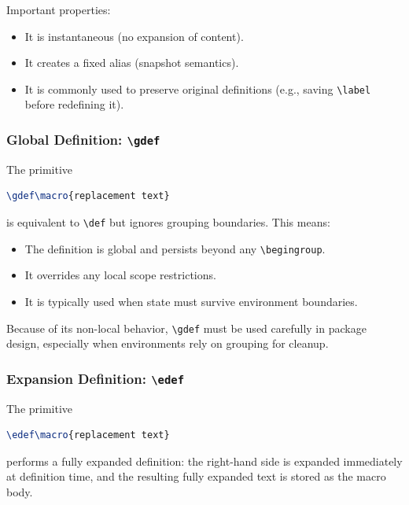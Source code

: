 Important properties:

\begin{itemize}
\item It is instantaneous (no expansion of content).
\item It creates a fixed alias (snapshot semantics).
\item It is commonly used to preserve original definitions (e.g., saving \lstinline|\label| before redefining it).
\end{itemize}

\subsubsection{Global Definition: \texttt{\textbackslash gdef}}

The primitive

\begin{lstlisting}[language=LaTeX]
\gdef\macro{replacement text}
\end{lstlisting}

is equivalent to \lstinline|\def| but ignores grouping boundaries. This means:

\begin{itemize}
\item The definition is global and persists beyond any \lstinline|\begingroup|.
\item It overrides any local scope restrictions.
\item It is typically used when state must survive environment boundaries.
\end{itemize}

Because of its non-local behavior, \lstinline|\gdef| must be used carefully in package design, especially when environments rely on grouping for cleanup.

\subsubsection{Expansion Definition: \texttt{\textbackslash edef}}

The primitive

\begin{lstlisting}[language=LaTeX]
\edef\macro{replacement text}
\end{lstlisting}

performs a fully expanded definition: the right-hand side is expanded immediately at definition time, and the resulting fully expanded text is stored as the macro body.

